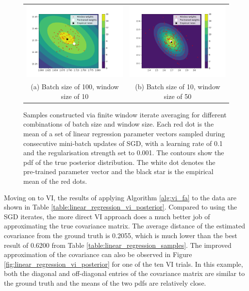 \documentclass[msc,deptreport.inf]{infthesis} %
\begin{document}
\begin{figure}[!htbp] 
	\begin{tabular}{cc}
		 \includegraphics[width=70mm]{plots/linear_model_average_weight_iterates__lr=0.1__lambda=0.001__batch_size=100__window_size=10.png}
		 & \includegraphics[width=70mm]{plots/linear_model_average_weight_iterates__lr=0.1__lambda=0.001__batch_size=10__window_size=50.png} \\
		 (a) Batch size of 100, window size of 10
		 & (b) Batch size of 10, window size of 50 \\[6pt]
	\end{tabular}
	\caption{Samples constructed via finite window iterate averaging for different combinations of batch size and window size. Each red dot is the mean of a set of linear regression parameter vectors sampled during consecutive mini-batch updates of SGD, with a learning rate of 0.1 and the regularisation strength set to 0.001. The contours show the pdf of the true posterior distribution. The white dot denotes the pre-trained parameter vector and the black star is the empirical mean of the red dots.}
	\label{fig:linear_regression_average_iterates}
\end{figure}

Moving on to VI, the results of applying Algorithm \ref{alg:vi_fa} to the data are shown in Table \ref{table:linear_regression_vi_posterior}. Compared to using the SGD iterates, the more direct VI approach does a much better job of approximating the true covariance matrix. The average distance of the estimated covariance from the ground truth is 0.2055, which is much lower than the best result of 0.6200 from Table \ref{table:linear_regression_samples}. The improved approximation of the covariance can also be observed in Figure \ref{fig:linear_regression_vi_posterior} for one of the ten VI trials. In this example, both the diagonal and off-diagonal entries of the covariance matrix are similar to the ground truth and the means of the two pdfs are relatively close. 
\end{document}
